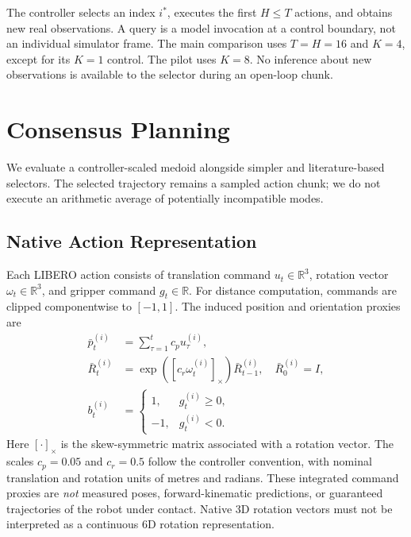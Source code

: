 \documentclass{article}
\newcommand{\R}{\mathbb{R}}
\begin{document}
The controller selects an index $i^*$, executes the first $H\le T$ actions,
and obtains new real observations. A query is a model invocation at a control
boundary, not an individual simulator frame. The main comparison uses
$T=H=16$ and $K=4$, except for its $K=1$ control. The pilot uses $K=8$.
No inference about new observations is available to the selector during an
open-loop chunk.

\section{Consensus Planning}
\label{sec:method}
We evaluate a controller-scaled medoid alongside simpler and literature-based
selectors. The selected trajectory remains a sampled action chunk; we do not
execute an arithmetic average of potentially incompatible modes.

\subsection{Native Action Representation}
Each LIBERO action consists of translation command $u_t\in\R^3$, rotation
vector $\omega_t\in\R^3$, and gripper command $g_t\in\R$. For distance
computation, commands are clipped componentwise to $[-1,1]$. The induced
position and orientation proxies are
\begin{align}
 \bar p_t^{(i)} &= \sum_{\tau=1}^{t}c_p u_\tau^{(i)},\label{eq:position}\\
 \bar R_t^{(i)} &= \exp([c_r\omega_t^{(i)}]_\times)
                   \bar R_{t-1}^{(i)},
 \quad \bar R_0^{(i)}=I,\label{eq:rotation}\\
 b_t^{(i)} &= \begin{cases}1,&g_t^{(i)}\ge0,\\-1,&g_t^{(i)}<0.\end{cases}
 \label{eq:gripper}
\end{align}
Here $[\cdot]_\times$ is the skew-symmetric matrix associated with a
rotation vector. The scales $c_p=0.05$ and $c_r=0.5$ follow the controller
convention, with nominal
translation and rotation units of metres and radians. These integrated
command proxies are \emph{not} measured poses, forward-kinematic predictions,
or guaranteed trajectories of the robot under contact. Native 3D rotation
vectors must not be interpreted as a continuous 6D rotation representation.
\end{document}

